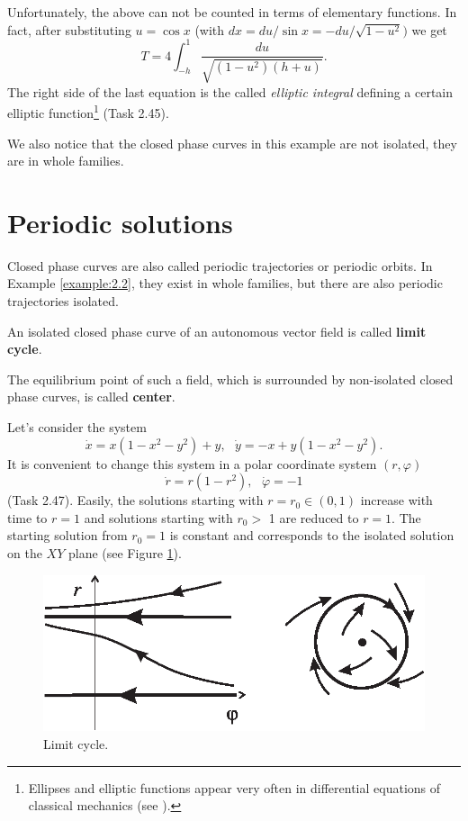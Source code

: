 \begin{example}
Unfortunately, the above can not be counted in terms of elementary functions. In fact, after substituting $ u = \cos x $ (with $ dx = du / \sin x = -du / \sqrt {1-u ^ {2}}) $ we get 
$$
T=4\int_{-h}^{1}\frac{du}{\sqrt{(1-u^{2})(h+u)}}.
$$
The right side of the last equation is the called \textit {elliptic integral} defining a certain elliptic function\footnote{Ellipses and elliptic functions appear very often in differential equations of classical mechanics (see \cite{Ar3}).} (Task 2.45).

We also notice that the closed phase curves in this example are not isolated, they are in whole families.
\end{example}

\section{Periodic solutions}

Closed phase curves are also called periodic trajectories or periodic orbits. In Example \ref{example:2.2}, they exist in whole families, but there are also periodic trajectories isolated.

\begin{definition}
	An isolated closed phase curve of an autonomous vector field is called  \textbf{limit cycle}.
	
	The equilibrium point of such a field, which is surrounded by non-isolated closed phase curves, is called \textbf {center}.
\end{definition}

\begin{example}\label{example:2.4}
	Let's consider the system
	$$
	\dot{x}=x(1-x^{2}-y^{2})+y,\text{ \ \ }\dot{y}=-x+y(1-x^{2}-y^{2}).
	$$
	It is convenient to change this system in a polar coordinate system $\left( r,\varphi \right) $%
	$$
	\dot{r}=r(1-r^{2}),\text{ \ \ }\dot{\varphi}=-1
	$$
	(Task 2.47). Easily, the solutions starting with $ r = r_ {0} \in \left (0,1 \right) $ increase with time to $ r = 1 $ and solutions starting with $ r_ {0}> $ 1 are reduced to $ r = 1 $. The starting solution from $ r_ {0} = 1 $ is constant and corresponds to the isolated solution on the $ XY $ plane (see Figure \ref{fig:2.2}).
\end{example}

\begin{figure}[!ht]
	\centering
	\includegraphics [scale=1]{jtr22}
	\caption{Limit cycle.}
	\label{fig:2.2}
\end{figure}

